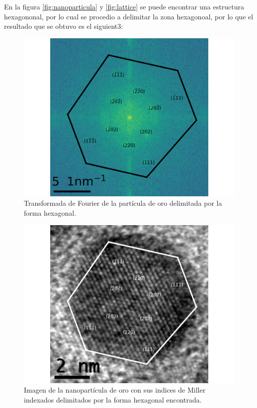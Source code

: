 \documentclass[reprint,amsmath,amssymb,aps,]{revtex4-2}
\begin{document}
En la figura \ref{fig:nanoparticula} y \ref{fig:lattice} se puede encontrar una estructura hexagononal, por lo cual se procedio a delimitar la zona hexagonoal, por lo que el resultado que se obtuvo es el siguient3:
\begin{figure}[H]
    \includegraphics[scale=0.4]{../Graphics/hexa.png}
    \caption{Transformada de Fourier de la partícula de oro delimitada por la forma hexagonal.}
\end{figure}
\begin{figure}[H]
    \includegraphics[scale=0.4]{../Graphics/nano_ind.png}
    \caption{Imagen de la nanopartícula de oro con sus indices de Miller indexados delimitados por la forma hexagonal encontrada.}
\end{figure}
\end{document}
